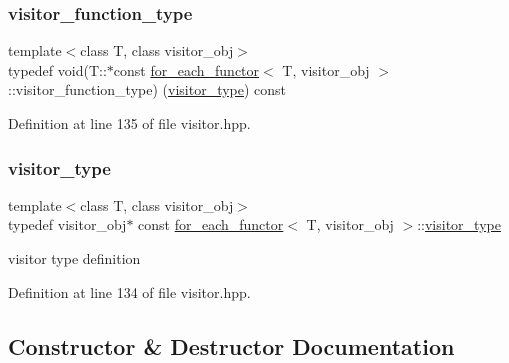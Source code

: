 \subsubsection{\texorpdfstring{visitor\+\_\+function\+\_\+type}{visitor\_function\_type}}
{\footnotesize\ttfamily template$<$class T, class visitor\+\_\+obj$>$ \\
typedef void(T\+::$\ast$const \hyperlink{classfor__each__functor}{for\+\_\+each\+\_\+functor}$<$ T, visitor\+\_\+obj $>$\+::visitor\+\_\+function\+\_\+type) (\hyperlink{classfor__each__functor_ad8dbe39e38c2b3c71543522a86565122}{visitor\+\_\+type}) const\hspace{0.3cm}{\ttfamily [private]}}



Definition at line 135 of file visitor.\+hpp.

\mbox{\label{classfor__each__functor_ad8dbe39e38c2b3c71543522a86565122}} 
\subsubsection{\texorpdfstring{visitor\+\_\+type}{visitor\_type}}
{\footnotesize\ttfamily template$<$class T, class visitor\+\_\+obj$>$ \\
typedef visitor\+\_\+obj$\ast$ const \hyperlink{classfor__each__functor}{for\+\_\+each\+\_\+functor}$<$ T, visitor\+\_\+obj $>$\+::\hyperlink{classfor__each__functor_ad8dbe39e38c2b3c71543522a86565122}{visitor\+\_\+type}\hspace{0.3cm}{\ttfamily [private]}}



visitor type definition 



Definition at line 134 of file visitor.\+hpp.



\subsection{Constructor \& Destructor Documentation}
\mbox{\label{classfor__each__functor_a3255ca866dbe26aa8f5c9bce0cddd58e}} 
